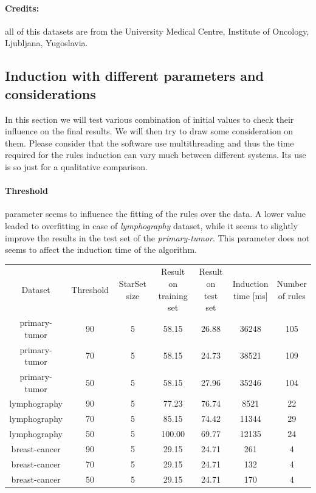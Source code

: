 \documentclass{article}
\begin{document}
\paragraph{Credits:} all of this datasets are from the University Medical Centre, Institute of Oncology, Ljubljana, Yugoslavia.

\subsection{Induction with different parameters and considerations}
In this section we will test various combination of initial values to check their influence on the final results. We will then try to draw some consideration on them.\newline
Please consider that the software use multithreading and thus the time required for the rules induction can vary much between different systems. Its use is so just for a qualitative comparison.

\paragraph{Threshold} parameter seems to influence the fitting of the rules over the data. A lower value leaded to overfitting in case of \textit{lymphography} dataset, while it seems to slightly improve the results in the test set of the \textit{primary-tumor}.\newline
This parameter does not seems to affect the induction time of the algorithm.

\begin{center}
    \begin{tabular}{ccccccc}
        Dataset & Threshold & StarSet size & \makecell{Result on\\training set} & \makecell{Result on\\test set} & \makecell{Induction\\time [ms]} & \makecell{Number\\of rules} \\

        primary-tumor & 90 & 5 & 58.15 & 26.88 & 36248 & 105 \\
        primary-tumor & 70 & 5 & 58.15 & 24.73 & 38521 & 109 \\
        primary-tumor & 50 & 5 & 58.15 & 27.96 & 35246 & 104 \\

        lymphography & 90 & 5 & 77.23 & 76.74 & 8521 & 22 \\
        lymphography & 70 & 5 & 85.15 & 74.42 & 11344 & 29 \\
        lymphography & 50 & 5 & 100.00 & 69.77 & 12135 & 24 \\

        breast-cancer & 90 & 5 & 29.15 & 24.71 & 261 & 4 \\
        breast-cancer & 70 & 5 & 29.15 & 24.71 & 132 & 4 \\
        breast-cancer & 50 & 5 & 29.15 & 24.71 & 170 & 4
    \end{tabular}
\end{center}
\end{document}

